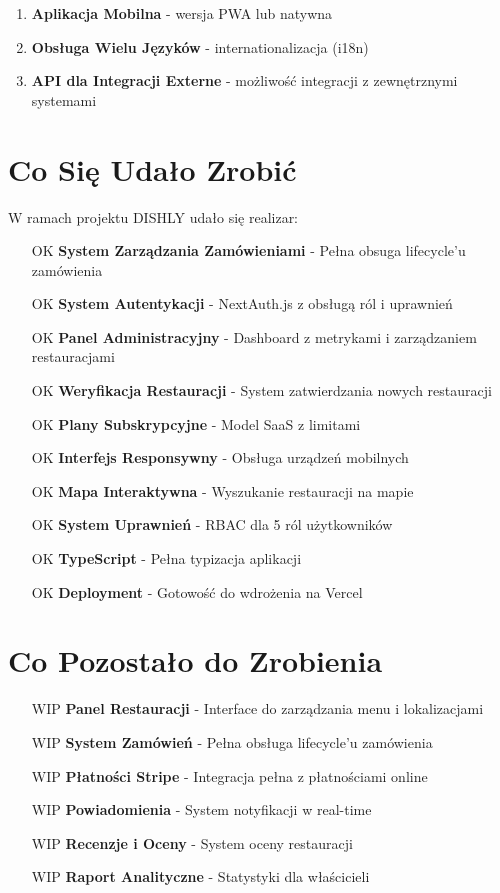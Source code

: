 \documentclass[12pt,a4paper,utf-8]{article}
\begin{document}
\begin{enumerate}
    \item \textbf{Aplikacja Mobilna}  -  wersja PWA lub natywna
    \item \textbf{Obsługa Wielu Języków}  -  internationalizacja (i18n)
    \item \textbf{API dla Integracji Externe}  -  możliwość integracji z zewnętrznymi systemami
\end{enumerate}

\section{Co Się Udało Zrobić}

W ramach projektu DISHLY udało się realizar:

\begin{itemize}
    \item [OK] \textbf{System Zarządzania Zamówieniami}  -  Pełna obsuga lifecycle'u zamówienia
    \item [OK] \textbf{System Autentykacji}  -  NextAuth.js z obsługą ról i uprawnień
    \item [OK] \textbf{Panel Administracyjny}  -  Dashboard z metrykami i zarządzaniem restauracjami
    \item [OK] \textbf{Weryfikacja Restauracji}  -  System zatwierdzania nowych restauracji
    \item [OK] \textbf{Plany Subskrypcyjne}  -  Model SaaS z limitami
    \item [OK] \textbf{Interfejs Responsywny}  -  Obsługa urządzeń mobilnych
    \item [OK] \textbf{Mapa Interaktywna}  -  Wyszukanie restauracji na mapie
    \item [OK] \textbf{System Uprawnień}  -  RBAC dla 5 ról użytkowników
    \item [OK] \textbf{TypeScript}  -  Pełna typizacja aplikacji
    \item [OK] \textbf{Deployment}  -  Gotowość do wdrożenia na Vercel
\end{itemize}

\section{Co Pozostało do Zrobienia}

\begin{itemize}
    \item [WIP] \textbf{Panel Restauracji}  -  Interface do zarządzania menu i lokalizacjami
    \item [WIP] \textbf{System Zamówień}  -  Pełna obsługa lifecycle'u zamówienia
    \item [WIP] \textbf{Płatności Stripe}  -  Integracja pełna z płatnościami online
    \item [WIP] \textbf{Powiadomienia}  -  System notyfikacji w real-time
    \item [WIP] \textbf{Recenzje i Oceny}  -  System oceny restauracji
    \item [WIP] \textbf{Raport Analityczne}  -  Statystyki dla właścicieli
\end{itemize}
\end{document}
